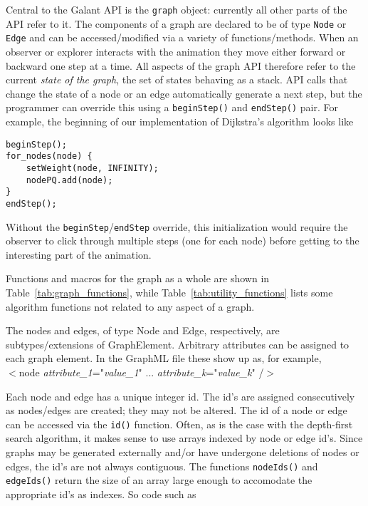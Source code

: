 Central to the Galant API is the \texttt{graph} object: currently all other
parts of the API refer to it.
The components of a graph are declared to be of type \texttt{Node} or
\texttt{Edge} and can be accessed/modified via a variety of
functions/methods.
When an observer or explorer interacts with the animation they move either
forward or backward one step at a time.
All aspects of the graph API therefore refer to the current \emph{state of
  the graph}, the set of states behaving as a stack.
API calls that change the state of a node or an edge automatically
generate a next step,
but the programmer can override this using a \texttt{beginStep()} and
\texttt{endStep()} pair. For example, the beginning of our implementation of
Dijkstra's algorithm looks like
\begin{verbatim}
beginStep();
for_nodes(node) {
    setWeight(node, INFINITY);
    nodePQ.add(node);
}
endStep();
\end{verbatim}
Without the \texttt{beginStep}/\texttt{endStep}
override, this initialization would require the observer to click
through multiple steps (one for each node) before getting to the interesting
part of the animation.





Functions and macros for the graph as a whole are shown in Table~\ref{tab:graph_functions}, while Table~\ref{tab:utility_functions} lists some algorithm functions not related to any aspect of a graph.

The nodes and edges, of type \textsf{Node} and \textsf{Edge}, respectively,
are subtypes/extensions of \textsf{GraphElement}.
Arbitrary attributes can be assigned to each graph element. In the GraphML file
these show up as, for example,\\
\hspace*{3em}
\textsf{
$<$node \emph{attribute\_1}="\emph{value\_1}" ... \emph{attribute\_k}="\emph{value\_k}" /$>$
}

Each node and edge has a unique integer id.
The id's are assigned consecutively as nodes/edges are created;
they may not be altered.
The id of a node or edge can be accessed via the \texttt{id()} function.
Often, as is the case with the depth-first search algorithm, it makes sense to use
arrays indexed by node or edge id's.
Since graphs may be generated externally and/or have undergone deletions of nodes or
edges, the id's are not always contiguous.
The functions \texttt{nodeIds()} and \texttt{edgeIds()} return the size of an array
large enough to accomodate the appropriate id's as indexes. So code such as

